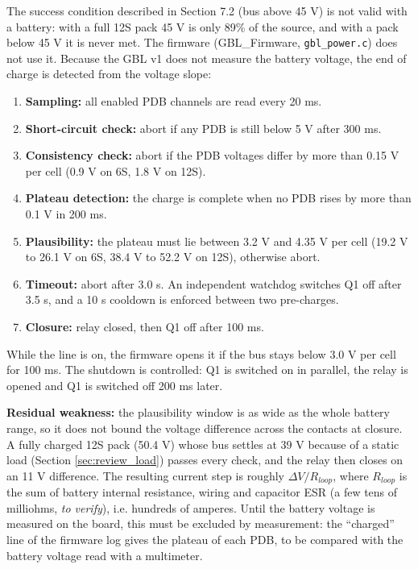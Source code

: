 \documentclass[11pt,a4paper]{article}
\begin{document}
The success condition described in Section 7.2 (bus above 45 V) is not valid with a battery: with a full 12S pack 45 V is only 89\% of the source, and with a pack below 45 V it is never met. The firmware (GBL\_Firmware, \texttt{gbl\_power.c}) does not use it. Because the GBL v1 does not measure the battery voltage, the end of charge is detected from the voltage slope:
\begin{enumerate}
    \item \textbf{Sampling:} all enabled PDB channels are read every 20 ms.
    \item \textbf{Short-circuit check:} abort if any PDB is still below 5 V after 300 ms.
    \item \textbf{Consistency check:} abort if the PDB voltages differ by more than 0.15 V per cell (0.9 V on 6S, 1.8 V on 12S).
    \item \textbf{Plateau detection:} the charge is complete when no PDB rises by more than 0.1 V in 200 ms.
    \item \textbf{Plausibility:} the plateau must lie between 3.2 V and 4.35 V per cell (19.2 V to 26.1 V on 6S, 38.4 V to 52.2 V on 12S), otherwise abort.
    \item \textbf{Timeout:} abort after 3.0 s. An independent watchdog switches Q1 off after 3.5 s, and a 10 s cooldown is enforced between two pre-charges.
    \item \textbf{Closure:} relay closed, then Q1 off after 100 ms.
\end{enumerate}
While the line is on, the firmware opens it if the bus stays below 3.0 V per cell for 100 ms. The shutdown is controlled: Q1 is switched on in parallel, the relay is opened and Q1 is switched off 200 ms later.

\textbf{Residual weakness:} the plausibility window is as wide as the whole battery range, so it does not bound the voltage difference across the contacts at closure. A fully charged 12S pack (50.4 V) whose bus settles at 39 V because of a static load (Section \ref{sec:review_load}) passes every check, and the relay then closes on an 11 V difference. The resulting current step is roughly $\Delta V / R_{loop}$, where $R_{loop}$ is the sum of battery internal resistance, wiring and capacitor ESR (a few tens of milliohms, \textit{to verify}), i.e. hundreds of amperes. Until the battery voltage is measured on the board, this must be excluded by measurement: the ``charged'' line of the firmware log gives the plateau of each PDB, to be compared with the battery voltage read with a multimeter.
\end{document}
